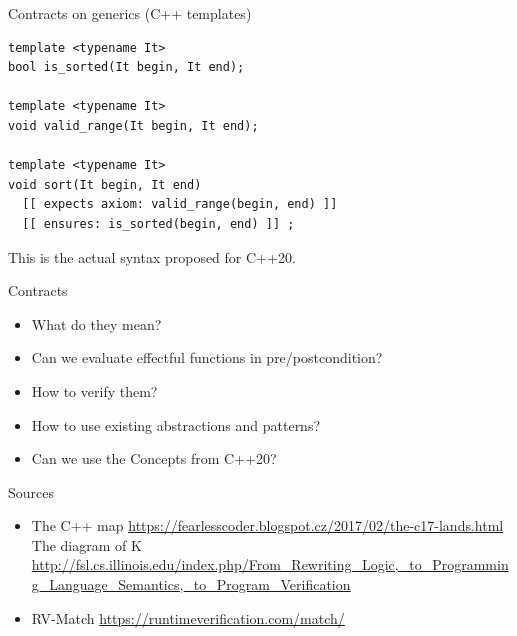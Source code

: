 \documentclass[11pt]{beamer}
\begin{document}
\begin{frame}[fragile=singleslide]{Contracts on generics (C++ templates)}
\begin{lstlisting}
template <typename It>
bool is_sorted(It begin, It end);

template <typename It>
void valid_range(It begin, It end);

template <typename It>
void sort(It begin, It end)
  [[ expects axiom: valid_range(begin, end) ]]
  [[ ensures: is_sorted(begin, end) ]] ;
\end{lstlisting}
\pause This is the actual syntax proposed for C++20.
\end{frame}


\begin{frame}{Contracts}
\begin{itemize}
\pause \item What do they mean?
\pause \item Can we evaluate effectful functions in pre/postcondition?
\pause \item How to verify them?
\pause \item How to use existing abstractions and patterns?
\pause \item Can we use the Concepts from C++20?
\end{itemize}
\end{frame}

\begin{frame}{Sources}
\begin{itemize}

\item The C++ map \url{https://fearlesscoder.blogspot.cz/2017/02/the-c17-lands.html}
The diagram of K \url{http://fsl.cs.illinois.edu/index.php/From\_Rewriting\_Logic,\_to\_Programming\_Language\_Semantics,\_to\_Program\_Verification} \\

\item RV-Match \url{https://runtimeverification.com/match/}


\end{itemize}
\end{frame}
\end{document}
